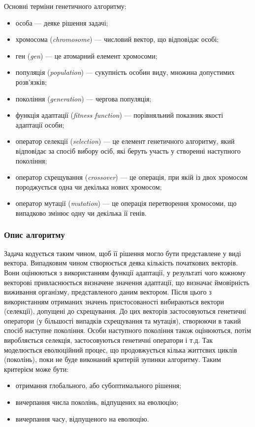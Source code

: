 Основні терміни генетичного алгоритму:
\begin{itemize}
	\item особа --- деяке рішення задачі;
	\item хромосома (\textit{chromosome}) --- числовий вектор, що відповідає особі;
	\item ген (\textit{gen}) --- це атомарний елемент хромосоми;
	\item популяція (\textit{population}) --- сукупність особин виду, множина допустимих\\розв’язків;
	\item покоління (\textit{generation}) --- чергова популяція;
	\item функція адаптації (\textit{fitness function}) --- порівняльний показник якості адаптації особи;
	\item  оператор селекції (\textit{selection}) --- це елемент генетичного алгоритму, який відповідає за спосіб вибору осіб, які беруть участь у створенні
наступного покоління;
	\item  оператор схрещування (\textit{crossover}) --- це операція, при якій із двох хромосом породжується одна чи декілька нових хромосом;
	\item  оператор мутації (\textit{mutation}) --- це операція перетворення хромосоми, що випадково змінює одну чи декілька її генів.
\end{itemize}

\subsubsection{Опис алгоритму}
Задача кодується таким чином, щоб її рішення могло бути представлене у виді вектора. Випадковим чином створюється деяка кількість початкових векторів. Вони оцінюються з використанням функції адаптації, у результаті чого кожному векторові привласнюється визначене значення адаптації, що визначає ймовірність виживання організму, представленого даним вектором. Після цього з використанням отриманих значень пристосованості вибираються вектори (селекції), допущені до схрещування. До цих векторів застосовуються генетичні оператори (у більшості випадків схрещування та мутація), створюючи в такий спосіб наступне покоління. Особи наступного покоління також оцінюються, потім виробляється селекція, застосовуються генетичні оператори і т.д. Так моделюється еволюційний процес, що продовжується кілька життєвих циклів (поколінь), поки не буде виконаний критерій зупинки алгоритму. Таким критерієм може бути:
\begin{itemize}
	\item отримання глобального, або субоптимального рішення;
	\item вичерпання числа поколінь, відпущених на еволюцію;
	\item вичерпання часу, відпущеного на еволюцію.
\end{itemize}

